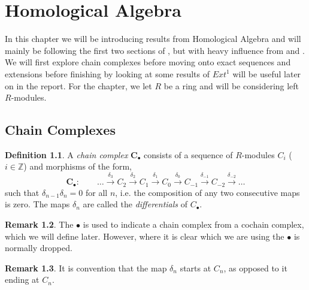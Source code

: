 \documentclass[11.5pt, twoside, a4paper, titlepage]{report}
\theoremstyle{definition}
\newtheorem{mydef}{Definition}[section]
\newtheorem{rem}[mydef]{Remark}
\theoremstyle{plain}
\begin{document}
\chapter{Homological Algebra}

In this chapter we will be introducing results from Homological Algebra and will mainly be following the first two sections of \cite{CB1}, but with heavy influence from \cite{Rotman} and \cite{Weibel}. We will first explore chain complexes before moving onto exact sequences and extensions before finishing by looking at some results of $Ext^1$ will be useful later on in the report. For the chapter, we let $R$ be a ring and will be considering left $R$-modules.

\section{Chain Complexes}

\begin{mydef}
A \emph{chain complex} $\mathbf{C}_{\bullet}$ consists of a sequence of $R$-modules $C_i$ ($i \in \mathbb{Z}$) and morphisms of the form,
\begin{equation*}
\mathbf{C_{\bullet}}: \qquad \dots \xrightarrow{\delta_{3}} C_2 \xrightarrow{\delta_{2}} C_1 \xrightarrow{\delta_{1 }} C_0 \xrightarrow{\delta_0} C_{-1} \xrightarrow{\delta_{-1}} C_{-2} \xrightarrow{\delta_{-2}}\dots
\end{equation*}
such that $\delta_{n-1}\delta_{n}=0$ for all $n$, i.e. the composition of any two consecutive maps is zero. The maps $\delta_n$ are called the \emph{differentials} of $C_{\bullet}$.
\end{mydef} 

\begin{rem}
The $\bullet$ is used to indicate a chain complex from a cochain complex, which we will define later. However, where it is clear which we are using the $\bullet$ is normally dropped.
\end{rem}

\begin{rem}
It is convention that the map $\delta_n$ starts at $C_n$, as opposed to it ending at $C_n$.
\end{rem}
\end{document}
